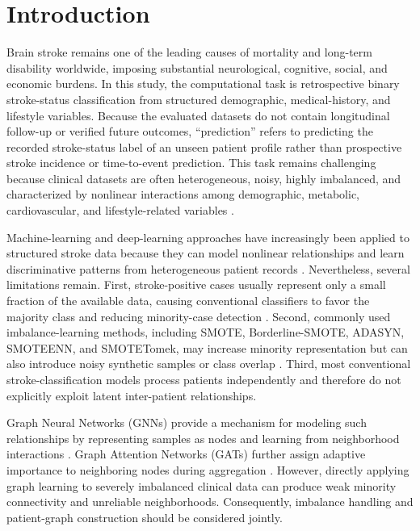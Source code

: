 \documentclass[pdflatex,sn-mathphys-num]{sn-jnl}%
\theoremstyle{thmstyleone}%
\theoremstyle{thmstyletwo}%
\theoremstyle{thmstylethree}%
\begin{document}
\maketitle


\section{Introduction}
\label{sec:introduction}

Brain stroke remains one of the leading causes of mortality and long-term
disability worldwide, imposing substantial neurological, cognitive, social,
and economic burdens.  {
In this study, the computational task is retrospective binary stroke-status
classification from structured demographic, medical-history, and lifestyle
variables. Because the evaluated datasets do not contain longitudinal
follow-up or verified future outcomes, ``prediction'' refers to predicting
the recorded stroke-status label of an unseen patient profile rather than
prospective stroke incidence or time-to-event prediction.
}
This task remains challenging because clinical datasets are often
heterogeneous, noisy, highly imbalanced, and characterized by nonlinear
interactions among demographic, metabolic, cardiovascular, and
lifestyle-related variables
\cite{yang2020early,johnson2023stroke,melnykova2025stroke}.

Machine-learning and deep-learning approaches have increasingly been applied
to structured stroke data because they can model nonlinear relationships and
learn discriminative patterns from heterogeneous patient records
\cite{tashkova2025comparative,akib2025optimizing,kanwal2025stroke}.
Nevertheless, several limitations remain. First, stroke-positive cases usually
represent only a small fraction of the available data, causing conventional
classifiers to favor the majority class and reducing minority-case detection
\cite{he2009learning,haixiang2017learning,fernandez2018learning,
abousaber2025robust}. Second, commonly used imbalance-learning methods,
including SMOTE, Borderline-SMOTE, ADASYN, SMOTEENN, and SMOTETomek, may
increase minority representation but can also introduce noisy synthetic
samples or class overlap
\cite{chawla2002smote,han2005borderline,he2008adasyn,batista2004study}.
Third, most conventional stroke-classification models process patients
independently and therefore do not explicitly exploit latent inter-patient
relationships.

Graph Neural Networks (GNNs) provide a mechanism for modeling such
relationships by representing samples as nodes and learning from neighborhood
interactions \cite{kipf2017semi,wu2021comprehensive,li2021graph}. Graph
Attention Networks (GATs) further assign adaptive importance to neighboring
nodes during aggregation \cite{velickovic2018graph}. However, directly
applying graph learning to severely imbalanced clinical data can produce weak
minority connectivity and unreliable neighborhoods. Consequently, imbalance
handling and patient-graph construction should be considered jointly.
\end{document}
